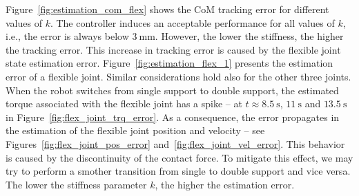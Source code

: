 Figure~\ref{fig:estimation_com_flex} shows the CoM tracking error for different values of $k$. The controller induces an acceptable performance for all values of $k$, i.e., the error is always below $\SI{3}{\milli\meter}$. However, the lower the stiffness, the higher the tracking error.  This increase in tracking error is caused by the flexible joint state estimation error.
Figure~\ref{fig:estimation_flex_1} presents the estimation error of a flexible joint. Similar considerations hold also for the other three joints. When the robot switches from single support to double support, the estimated torque associated with the flexible joint has a spike -- at $t\approx\SI{8.5}{\second}$, $\SI{11}{\second}$ and $\SI{13.5}{\second}$ in Figure~\ref{fig:flex_joint_trq_error}. As a consequence, the error propagates in the estimation of the flexible joint position and velocity -- see Figures~\ref{fig:flex_joint_pos_error} and~\ref{fig:flex_joint_vel_error}. This behavior is caused by the discontinuity of the contact force. To mitigate this effect, we may try to perform a smother transition from single to double support and vice versa.
The lower the stiffness parameter $k$, the higher the estimation error. 




